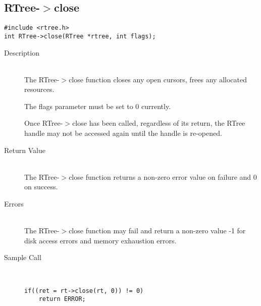 \documentclass[12pt]{article}
\def\cdf{\sf }
\def\cdf{\sf }
\newcommand{\RTREE}{{\small{\cdf RTree}}}
\begin{document}
\subsection{{\RTREE}-$>$close}
\begin{verbatim}
#include <rtree.h>
int RTree->close(RTree *rtree, int flags);
\end{verbatim}
\begin{description}
\item[Description]\ \\
The {\RTREE}-$>$close function closes any open cursors, frees any
allocated resources.

The flags parameter must be set to 0 currently.  

Once {\RTREE}-$>$close has been called, regardless of its return, the
{\RTREE} handle may not be accessed again until the handle is
re-opened.
\item[Return Value]\ \\
The {\RTREE}-$>$close function returns a non-zero error value on failure
and 0 on success.
\item[Errors]\ \\
  The {\RTREE}-$>$close function may fail and return a non-zero
  value -1 for disk access errors and memory exhaustion errors.
\item[Sample Call]\ 
\begin{verbatim}
if((ret = rt->close(rt, 0)) != 0)
    return ERROR;
\end{verbatim}
\end{description}

\newpage
\end{document}
